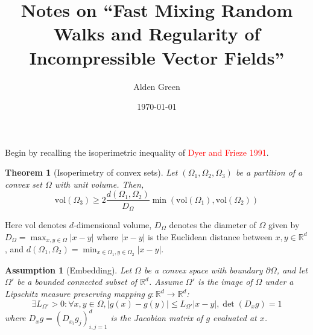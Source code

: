 \documentclass{article}
\newcommand{\Reals}{\mathbb{R}}
\newcommand{\abs}[1]{\left \lvert #1 \right \rvert}
\newcommand{\vol}{\mathrm{vol}}
\newcommand{\Rd}{\Reals^d}
\newcommand{\1}{\mathbf{1}}
\theoremstyle{alden}
\theoremstyle{aldenthm}
\newtheorem{theorem}{Theorem}
\newtheorem{assumption}{Assumption}
\theoremstyle{remark}
\begin{document}
	
\title{Notes on ``Fast Mixing Random Walks and Regularity of Incompressible Vector Fields''}
\author{Alden Green}
\date{\today}
\maketitle

Begin by recalling the isoperimetric inequality of \textcolor{red}{Dyer and Frieze 1991}. 

\begin{theorem}[Isoperimetry of convex sets]
	\label{thm: dyer}
	Let $(\Omega_1, \Omega_2, \Omega_3)$ be a partition of a convex set $\Omega$ with unit volume. Then,
	\begin{equation*}
	\vol(\Omega_3) \geq 2\frac{d(\Omega_1, \Omega_2)}{D_{\Omega}} \min(\vol(\Omega_1), \vol(\Omega_2))
	\end{equation*}
\end{theorem}

Here $\vol$ denotes $d$-dimensional volume, $D_{\Omega}$ denotes the diameter of $\Omega$ given by $D_{\Omega} = \max_{x,y \in \Omega} \abs{x - y}$ where $\abs{x - y}$ is the Euclidean distance between $x,y \in \Rd$, and $d(\Omega_1, \Omega_2) = \min_{x \in \Omega_1, y \in \Omega_2} \abs{x - y}$. 

\begin{assumption}[Embedding]
	\label{asmp: embedding}
	Let $\Omega$ be a convex space with boundary $\partial \Omega$, and let $\Omega'$ be a bounded connected subset of $\Rd$. Assume $\Omega'$ is the image of $\Omega$ under a Lipschitz measure preserving mapping $g: \Rd \to \Rd$:
	\begin{equation*}
	\exists L_{\Omega'} > 0: \forall x,y \in \Omega, \abs{g(x) - g(y)} \leq L_{\Omega'} \abs{x - y}, \det(D_x g) = 1
	\end{equation*}
	where $D_x g = (D_{x_i} {g_j})_{i,j = 1}^{d}$ is the Jacobian matrix of $g$ evaluated at $x$.
\end{assumption}
\end{document}
